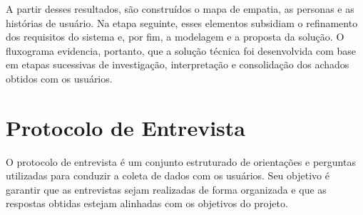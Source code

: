 A partir desses resultados, são construídos o mapa de empatia, as personas e as histórias de usuário. Na etapa seguinte, esses elementos subsidiam o refinamento dos requisitos do sistema e, por fim, a modelagem e a proposta da solução. O fluxograma evidencia, portanto, que a solução técnica foi desenvolvida com base em etapas sucessivas de investigação, interpretação e consolidação dos achados obtidos com os usuários.

\clearpage
\section{Protocolo de Entrevista}

O protocolo de entrevista é um conjunto estruturado de orientações e perguntas utilizadas para conduzir a coleta de dados com os usuários. Seu objetivo é garantir que as entrevistas sejam realizadas de forma organizada e que as respostas obtidas estejam alinhadas com os objetivos do projeto.

